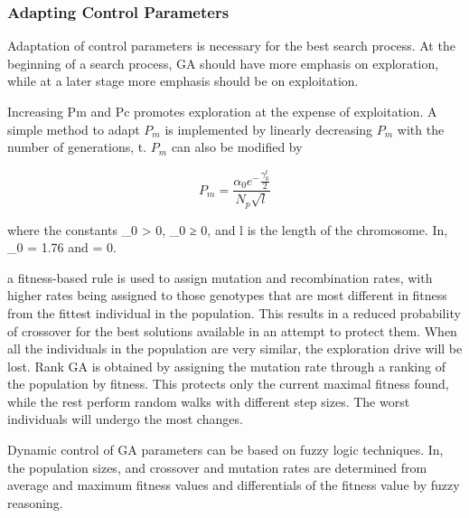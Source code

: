 \documentclass[14pt]{article}
\numberwithin{equation}{subsection}
\begin{document}
			\subsubsection{Adapting Control Parameters}Adaptation of control parameters is necessary for the best search
			process. At the beginning of a search process, GA should have more emphasis on exploration, while at a later
			stage more emphasis should be on exploitation. \par
			Increasing Pm and Pc promotes exploration at the expense of exploitation. A simple method to adapt $P_m$ is
			implemented by linearly decreasing $P_m$ with the number of generations, t. $P_m$ can also be modified by
			
			\begin{equation}
				P_m = \frac{\alpha_0e^-\frac{\gamma_0^t}{2} }{N_p \sqrt{l}}
			\end{equation}
			
			\noindent where the constants \alpha_0 > 0, \gamma_0 ≥ 0, and l is the length of the chromosome. In, 
			\alpha_0 = 1.76 and \gamma = 0. \par
			a fitness-based rule is used to assign mutation and recombination rates, with higher rates being
			assigned to those genotypes that are most different in fitness from the fittest individual in the population.
			This results in a reduced probability of crossover for the best solutions available in an attempt to protect
			them. When all the individuals in the population are very similar, the exploration drive will be lost. Rank
			GA is obtained by assigning the mutation rate through a ranking of the population by fitness. This protects
			only the current maximal fitness found, while the rest perform random walks with different step sizes. The
			worst individuals will undergo the most changes. \par
			Dynamic control of GA parameters can be based on fuzzy logic techniques. In, the population sizes, and
			crossover and mutation rates are determined from average and maximum fitness values and differentials of the
			fitness value by fuzzy reasoning.
			
\end{document}
